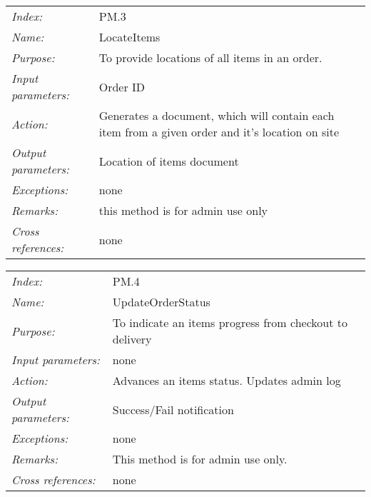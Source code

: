\documentclass[10pt,letter]{article}
\begin{document}
\begin{tabularx}{\textwidth}{l X}

    \it{Index:} &  PM.3\\

    \it{Name:} & LocateItems \\

    \it{Purpose:} & To provide locations of all items in an order. \\

    \it{Input parameters:} & Order ID  \\

    \it{Action:} & Generates a document, which will contain each item from a given order and it's location on site\\

    \it{Output parameters:} & Location of items document\\

    \it{Exceptions:} & none\\

    \it{Remarks:} & this method is for admin use only\\

    \it{Cross references:} & none\\

    \hline

\end{tabularx}
\begin{tabularx}{\textwidth}{l X}

    \it{Index:} & PM.4 \\

    \it{Name:} &  UpdateOrderStatus\\

    \it{Purpose:} &  To indicate an items progress from checkout to delivery\\

    \it{Input parameters:} & none \\

    \it{Action:} & Advances an items status. Updates admin log\\

    \it{Output parameters:} & Success/Fail notification\\

    \it{Exceptions:} & none\\

    \it{Remarks:} & This method is for admin use only.\\

    \it{Cross references:} & none\\

    \hline

\end{tabularx}
\end{document}
